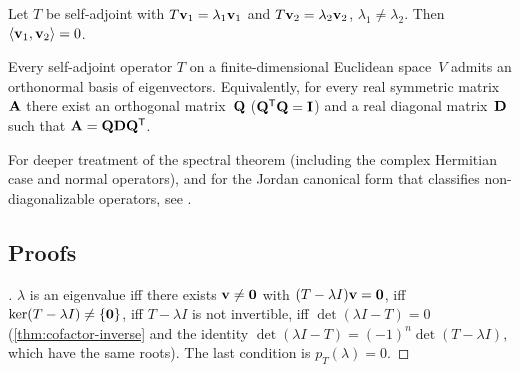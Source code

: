 \begin{theorem}
\label{thm:self-adj-orthog}
Let $T$ be self-adjoint with $T\mathbf{v}_1 = \lambda_1 \mathbf{v}_1$ and
$T\mathbf{v}_2 = \lambda_2 \mathbf{v}_2$, $\lambda_1 \neq \lambda_2$. Then
$\langle \mathbf{v}_1, \mathbf{v}_2 \rangle = 0$.
\end{theorem}

\begin{theorem}
\label{thm:spectral}
Every self-adjoint operator $T$ on a finite-dimensional Euclidean
space~$V$ admits an orthonormal basis of eigenvectors. Equivalently,
for every real symmetric matrix~$\mathbf{A}$ there exist an orthogonal
matrix~$\mathbf{Q}$ ($\mathbf{Q}^{\mathsf{T}} \mathbf{Q} = \mathbf{I}$) and a real diagonal
matrix~$\mathbf{D}$ such that $\mathbf{A} = \mathbf{Q}\mathbf{D}\mathbf{Q}^{\mathsf{T}}$.
\end{theorem}

\begin{remark}
For deeper treatment of the spectral theorem (including the complex
Hermitian case and normal operators), and for the Jordan canonical
form that classifies non-diagonalizable operators, see
\cite{Beklemishev2025}.
\end{remark}

\subsection*{Proofs}

\begin{proof}[]
$\lambda$ is an eigenvalue iff there exists $\mathbf{v} \neq \mathbf{0}$
with $(T - \lambda I)\mathbf{v} = \mathbf{0}$, iff $\ker(T - \lambda I) \neq \{\mathbf{0}\}$,
iff $T - \lambda I$ is not invertible, iff
$\det(\lambda I - T) = 0$ (\cref{thm:cofactor-inverse} and the
identity $\det(\lambda I - T) = (-1)^n \det(T - \lambda I)$, which
have the same roots). The last condition is $p_T(\lambda) = 0$.
\end{proof}

